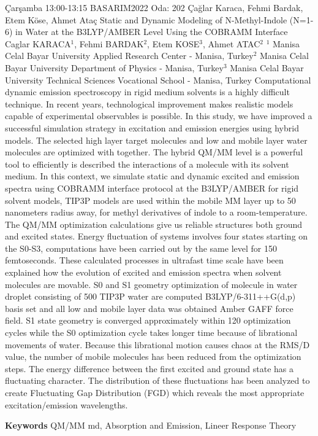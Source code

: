 
    \begin{abstract_basarim}
    {Çarşamba 13:00-13:15}
    {BASARIM2022}
    {Oda: 202}
    {Çağlar Karaca, Fehmi Bardak, Etem Köse, Ahmet Ataç}
    {Static and Dynamic Modeling of N-Methyl-Indole \newline\noindent (N=1-6) in Water at the B3LYP/AMBER Level Using the COBRAMM Interface}
    {%
    Caglar KARACA$^{1}$, Fehmi BARDAK$^{2}$, Etem KOSE$^{3}$, Ahmet ATAC$^{2}$}
    {%
    }
    {%
    $^1$ Manisa Celal Bayar University Applied Research Center - Manisa, Turkey\newline{}$^2$ Manisa Celal Bayar University Department of Physics - Manisa, Turkey\newline{}$^3$ Manisa Celal Bayar University Technical Sciences Vocational School - Manisa, Turkey}
    Computational dynamic emission spectroscopy in rigid medium solvents is a highly difficult technique. In recent years, technological improvement makes realistic models capable of experimental observables is possible. In this study, we have improved a successful simulation strategy in excitation and emission energies using hybrid models. The selected high layer target molecules and low and mobile layer water molecules are optimized with together. The hybrid QM/MM level is a powerful tool to efficiently is described the interactions of a molecule with its solvent medium. In this context, we simulate static and dynamic excited and emission spectra using COBRAMM interface protocol at the B3LYP/AMBER for rigid solvent models, TIP3P models are used within the mobile MM layer up to 50 nanometers radius away, for methyl derivatives of indole to a room-temperature. The QM/MM optimization calculations give us reliable structures both ground and excited states. Energy fluctuation of systems involves four states starting on the S0-S3, computations have been carried out by the same level for 150 femtoseconds. These calculated processes in ultrafast time scale have been explained how the evolution of excited and emission spectra when solvent molecules are movable. S0 and S1 geometry optimization of molecule in water droplet consisting of 500 TIP3P water are computed B3LYP/6-311++G(d,p) basis set and all low and mobile layer data was obtained Amber GAFF force field. S1 state geometry is converged approximately within 120 optimization cycles while the S0 optimization cycle takes longer time because of librational movements of water. Because this librational motion causes chaos at the RMS/D value, the number of mobile molecules has been reduced from the optimization steps. The energy difference between the first excited and ground state has a fluctuating character. The distribution of these fluctuations has been analyzed to create Fluctuating Gap Distribution (FGD) which reveals the most appropriate excitation/emission wavelengths. 
    
        \textbf{Keywords} \newline{}QM/MM md, Absorption and Emission, Lineer Response Theory
    \end{abstract_basarim}
    